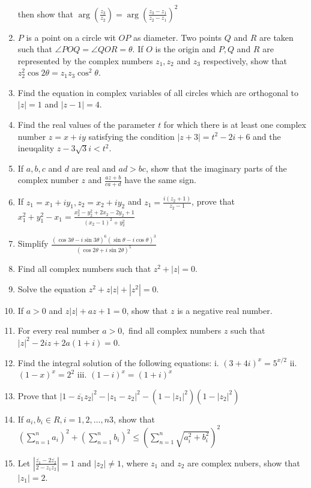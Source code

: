 \begin{enumerate}[resume]
    then show that $\arg\left(\frac{z_3}{z_2}\right) = \arg\left(\frac{z_3 - z_1}{z_2 - z_1}\right)^2$
\item $P$ is a point on a circle wit $OP$ as diameter. Two points $Q$ and $R$ are taken such that $\angle POQ = \angle QOR =
  \theta$. If $O$ is the origin and $P, Q$ and $R$ are represented by the complex numbers $z_1, z_2$ and $z_3$ respectively, show
  that $z_2^2\cos2\theta = z_1z_3\cos^2\theta$.
\item Find the equation in complex variables of all circles which are orthogonal to $|z| = 1$ and $|z - 1| = 4$.
\item Find the real values of the parameter $t$ for which there is at least one complex number $z = x + iy$ satisfying the
  condition $|z + 3| = t^2 - 2i + 6$ and the ineuqality $z - 3\sqrt{3}i < t^2$.
\item If $a, b, c$ and $d$ are real and $ad > bc$, show that the imaginary parts of the complex number $z$ and $\frac{az + b}{ca +
  d}$ have the same sign.
\item If $z_1 = x_1 + iy_1, z_2 = x_2 + iy_2$ and $z_1 = \frac{i(z_2 +1)}{z_2 - 1}$, prove that $x_1^2 + y_1^2 - x_1 = \frac{x_2^2
  - y_2^2 + 2x_2 - 2y_2 + 1}{(x_2 - 1)^2 + y_2^2}$
\item Simplify $\frac{(\cos3\theta - i\sin3\theta)^6(\sin\theta - i\cos\theta)^3}{(\cos2\theta + i\sin2\theta)^5}$
\item Find all complex numbers such that $z^2 + |z| = 0$.
\item Solve the equation $z^2 + z|z| + |z^2| = 0$.
\item If $a > 0$ and $z|z| + az + 1 = 0$, show that $z$ is a negative real number.
\item For every real number $a > 0,$ find all complex numbers $z$ such that $|z|^2 - 2iz + 2a(1 + i) = 0$.
\item Find the integral solution of the following equations: i. $(3 + 4i)^x = 5^{x/2}$ ii. $(1 - x)^x = 2^2 $ iii. $(1 - i)^x = (1 +
  i)^x$
\item Prove that $|1 - \overline{z_1}z_2|^2 - |z_1 - z_2|^2 - (1 - |z_1|^2)(1 - |z_2|^2)$
\item If $a_i, b_i\in R, i = 1, 2, \ldots, n3$, show that $\left(\sum_{n = 1}^na_i\right)^2 + \left(\sum_{n = 1}^nb_i\right)^2 \leq
  \left(\sum_{n = 1}^n\sqrt{a_i^2 + b_i^2}\right)^2$
\item Let $\left|\frac{\overline{z_1} - 2\overline{z_2}}{2 - z_1\overline{z_2}}\right| = 1$ and $|z_2|\neq 1$, where $z_1$ and
  $z_2$ are complex nubers, show that $|z_1| = 2$.

\end{enumerate}
